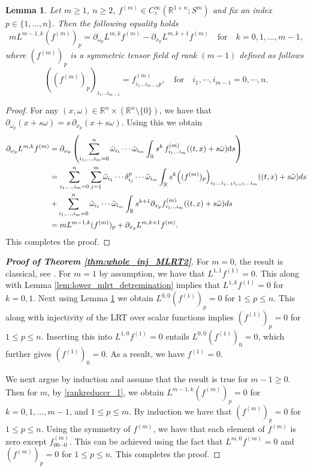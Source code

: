 \documentclass[11pt,a4paper,reqno]{amsart}
\newtheorem{lemma}[definition]{Lemma}
\newcommand{\Rn}{\mathbb{R}^n}
\newcommand{\R}{\mathbb{R}}
\newcommand{\D}{\mathrm{d}}
\newcommand{\om}{\omega}
\newcommand{\PD}{\partial}
\begin{document}
	\begin{lemma}\label{gen1}
		Let $m\geq 1$, $n\geq 2$, $f^{(m)} \in C_{c}^{\infty}(\mathbb{R}^{1+n};S^m) $ and fix an index $p \in \{1,\dots,n\}$. Then the following equality holds
		\begin{equation}\label{rankreducer_1}
			mL^{m-1,k}(f^{(m)})_p =\partial_{\omega_p}L^{m,k}f^{(m)}-\partial_{x_p}L^{m,k+1}f^{(m)} \quad \text{for} \quad k=0,1,\dots,m-1,
		\end{equation}
		where $(f^{(m)})_p$ is a symmetric tensor field of rank $(m-1)$ defined as follows
		\[
		((f^{(m)})_p)_{i_1\dots i_{m-1}}=f^{(m)}_{i_1\dots i_{m-1}p}, \quad \mbox{for} \quad i_1,\cdots,i_{m-1} = 0,\cdots,n.
		\]
	\end{lemma}
		\begin{proof}
			For any $(x,\omega)\in \Rn \times (\Rn\setminus \{0\})$, we have that $\PD_{\omega_p} (x+s\omega)= s\, \PD_{x_p} (x+s\omega)$. Using this we obtain 
			\begin{align*}
				\partial_{\omega_p}L^{m,k}f^{(m)} &= \PD_{\omega_p} \left( \sum_{i_{1},\dots,i_{m}=0}^{n}\Tilde{\omega}_{i_{1}}\cdots \Tilde{\omega}_{i_{m}}\int_{\mathbb{R}} s^k\,f_{i_{1}\dots i_{m}}^{(m)}((t,x)+s\Tilde{\omega})\D s\right)\\
				&= \sum_{i_1,\dots,i_m=0}^{n}\sum_{j=1}^m\tilde{\om}_{i_1}\cdots \delta_{i_j}^p\cdots\tilde{\om}_{i_m}\int_{\R}s^k\Big((f^{(m)})_p\Big)_{i_1\dots i_{j-1}i_{j+1}\dots i_m}((t,x)+s\tilde{\om})ds\\&+ \sum_{i_1,\dots,i_m=0}^{n}\tilde{\om}_{i_1}\cdots \tilde{\om}_{i_m}\int_{\R}s^{k+1}\PD_{x_p}f^{(m
					)}_{i_1\dots i_m}((t,x)+s\tilde{\om})ds\\
				&= m L^{m-1,k} (f^{(m)})_p+\PD_{x_p} L^{m,k+1} f^{(m)}.
			\end{align*}
			This completes the proof.
		\end{proof}
	
	\begin{proof}[\textbf{Proof of Theorem \ref{thm:whole_inj_MLRT2}}]
		For $m=0$, the result is classical, see \cite{stefanov1989inverse,ramm1991inverse}. For $m=1$ by assumption, we have that $L^{1,1} f^{(1)}=0$. This along with Lemma \ref{lem:lower_mlrt_detremination} implies that $ L^{1,k} f^{(1)}=0$ for $k=0,1$. Next using Lemma \ref{gen1} we obtain $L^{0,0}(f^{(1)})_p=0$ for $1\le p\le n$. This along with injectivity of the LRT over scalar functions implies $(f^{(1)})_p=0$ for $1\le p\le n$. Inserting this into $ L^{1,0} f^{(1)}=0$ entails $L^{0,0} (f^{(1)})_0=0$, which further gives $ (f^{(1)})_0=0$. As a result, we have $f^{(1)}=0$.
		
	We next argue by induction and assume that the result is true for $m-1\ge 0$.  Then for $m$, by \eqref{rankreducer_1}, we obtain \( L^{m-1,k}(f^{(m)})_p = 0 \) for \( k = 0, 1, \ldots, m-1 \), and $1\le p\le m$. By induction we have that $(f^{(m)})_p =0$ for $1\le p\le n$. Using the symmetry of $f^{(m)}$, we have that each element of  $f^{(m)}$ is zero except $ f^{(m)}_{00 \cdots 0}$. This can be achieved using the fact that $L^{m,0}f^{(m)}=0$ and  $(f^{(m)})_p =0$ for $1\le p\le n$. This completes the proof. 
	\end{proof}
\end{document}
